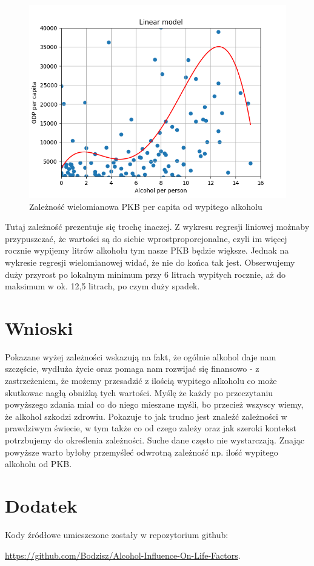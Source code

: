 \documentclass[10pt]{article}
\begin{document}
\begin{figure}[H]
    \begin{center}
        \includegraphics[width=0.8\linewidth]{plots/GDP_dependence_poly.png}
        \caption{Zależność wielomianowa PKB per capita od wypitego alkoholu}
    \end{center}
\end{figure}

Tutaj zależność prezentuje się trochę inaczej.
Z wykresu regresji liniowej możnaby przypuszczać, że wartości są do siebie wprostproporcjonalne, czyli im więcej rocznie wypijemy litrów alkoholu tym nasze PKB będzie większe.
Jednak na wykresie regresji wielomianowej widać, że nie do końca tak jest.
Obserwujemy duży przyrost po lokalnym minimum przy 6 litrach wypitych rocznie, aż do maksimum w ok. 12,5 litrach, po czym duży spadek.

\section{Wnioski}
Pokazane wyżej zależności wskazują na fakt, że ogólnie alkohol daje nam szczęście, wydłuża życie oraz pomaga nam rozwijać się finansowo - z zastrzeżeniem, że możemy przesadzić z ilością wypitego alkoholu co może skutkowac nagłą obniżką tych wartości.
Myślę że każdy po przeczytaniu powyższego zdania miał co do niego mieszane myśli, bo przecież wszyscy wiemy, że alkohol szkodzi zdrowiu.
Pokazuje to jak trudno jest znaleźć zależności w prawdziwym świecie, w tym także co od czego zależy oraz jak szeroki kontekst potrzbujemy do określenia zależności.
Suche dane często nie wystarczają.
Znając powyższe warto byłoby przemyśleć odwrotną zależność np. ilość wypitego alkoholu od PKB.

\pagebreak
\appendix
\section{Dodatek}
Kody źródłowe umieszczone zostały w repozytorium github:

\noindent \url{https://github.com/Bodzisz/Alcohol-Influence-On-Life-Factors}.
\end{document}
